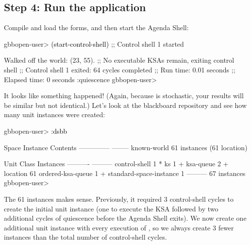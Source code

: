 \documentclass[10pt,twoside,english,pdftex]{article}
\begin{document}
\subsection*{Step 4:  Run the application}

%
%
Compile and load the  forms, and then start the
Agenda Shell:
%
\W\supp
\begin{example}
\textcolor{darkergray}{%
  gbbopen-user> \textcolor{black}{(start-control-shell)}
  ;; Control shell 1 started

  Walked off the world: (23, 55).
  ;; No executable KSAs remain, exiting control shell
  ;; Control shell 1 exited: 64 cycles completed
  ;; Run time: 0.01 seconds
  ;; Elapsed time: 0 seconds
  :quiescence
  gbbopen-user>}
\end{example}

%
%
It looks like something happened! (Again, because
 is stochastic, your results will be similar
but not identical.)  Let's look at the blackboard repository and see how many
 unit instances were created:
%
\W\supp
\begin{example}
\textcolor{darkergray}{%
  gbbopen-user> \textcolor{black}{:dsbb}

  Space Instance                Contents
  --------------                --------
  known-world                   61 instances (61 location)

  Unit Class                    Instances
  ----------                    ---------
  control-shell                         1 *
  ks                                    1 +
  ksa-queue                             2 +
  location                             61
  ordered-ksa-queue                     1 +
  standard-space-instance               1
                                ---------
                                       67 instances
  gbbopen-user>}
\end{example}

The 61  instances makes sense.  Previously, it required
3 control-shell cycles to create the initial  unit
instance (one to execute the  KSA followed by two
additional cycles of quiescence before the Agenda Shell exits).  We now create
one additional  unit instance with every execution of
, so we always create 3 fewer
 instances than the total number of control-shell
cycles.
\end{document}
